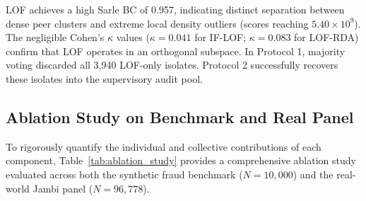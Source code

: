 \documentclass[conference]{IEEEtran}
\begin{document}
LOF achieves a high Sarle BC of 0.957, indicating distinct separation between dense peer clusters and extreme local density outliers (scores reaching $5.40 \times 10^9$). The negligible Cohen's $\kappa$ values ($\kappa = 0.041$ for IF-LOF; $\kappa = 0.083$ for LOF-RDA) confirm that LOF operates in an orthogonal subspace. In Protocol 1, majority voting discarded all 3,940 LOF-only isolates. Protocol 2 successfully recovers these isolates into the supervisory audit pool.

\subsection{Ablation Study on Benchmark and Real Panel}

To rigorously quantify the individual and collective contributions of each component, Table~\ref{tab:ablation_study} provides a comprehensive ablation study evaluated across both the synthetic fraud benchmark ($N = 10,000$) and the real-world Jambi panel ($N = 96,778$).

\begin{table}[htbp]
\centering
\caption{Ablation Study: Synthetic Benchmark Recovery vs Real-World Exposure}
\label{tab:ablation_study}
\setlength{\tabcolsep}{2.0pt}
\end{table}
\end{document}
